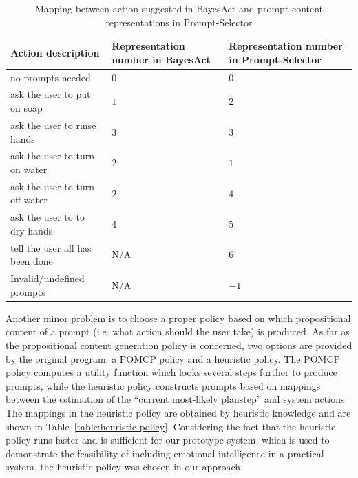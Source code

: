 %
\begin{table}
\centering
\caption{Mapping between action suggested in BayesAct and prompt content representations in Prompt-Selector}
\label{table:prompt-number-def}
\begin{tabular}{| l | p{5cm} | p{5cm} |}
\hline
Action description & Representation number in BayesAct & Representation number in Prompt-Selector \\ \hline
no prompts needed & 0 & 0\\ \hline
ask the user to put on soap & $1$ & $2$ \\ \hline
ask the user to rinse hands & $3$ & $3$ \\ \hline
ask the user to turn on water & $2$ & $1$ \\ \hline
ask the user to turn off water & $2$ & $4$ \\ \hline
ask the user to to dry hands & $4$ & $5$ \\ \hline
tell the user all has been done & N/A & $6$ \\ \hline
Invalid/undefined prompts & N/A &$-1$ \\ \hline
\end{tabular}
\end{table}

Another minor problem is to choose a proper policy based on which propositional content of a prompt (i.e. what action should the user take) is produced. As far as the propositional content generation policy is concerned, two options are provided by the original program: a POMCP policy and a heuristic policy. The POMCP policy computes a utility function which looks several steps further to produce prompts, while the heuristic policy constructs prompts based on mappings between the estimation of the ``current most-likely  planstep'' and system actions. The mappings in the heuristic policy are obtained by heuristic knowledge and are shown in Table~\ref{table:heuristic-policy}. Considering the fact that the heuristic policy runs faster and is sufficient for our prototype system, which is used to demonstrate the feasibility of including emotional intelligence in a practical system, the heuristic policy was chosen in our approach.

